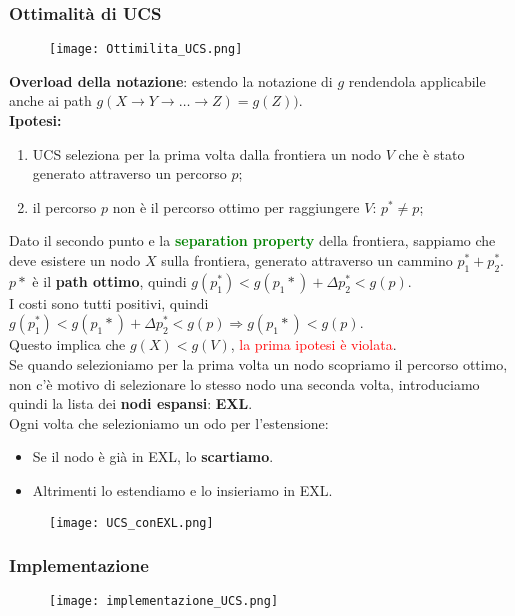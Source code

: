 \documentclass{article}
\begin{document}
\subsubsection{Ottimalità di UCS}
\begin{figure}[H]
    \texttt{[image: Ottimilita\_UCS.png]}
\end{figure}
\textbf{Overload della notazione}: estendo la notazione di $g$ rendendola applicabile anche ai path $g(X → Y → \dots → Z) = g(Z))$.
\\ \textbf{Ipotesi:}
\begin{enumerate}
    \item UCS seleziona per la prima volta dalla frontiera un nodo $V$ che è stato generato attraverso un percorso $p$;
    \item il percorso $p$ non è il percorso ottimo per raggiungere $V$: $p^* \neq p$;
\end{enumerate}
Dato il secondo punto e la \textcolor{green}{\textbf{separation property}} della frontiera, sappiamo che deve esistere un nodo $X$ sulla frontiera, generato attraverso un cammino $p_1^*+ p_2^*$. \\
$p*$ è il \textbf{path ottimo}, quindi $g(p_1^*)<g(p_1*)+\Delta{p_2^*} < g(p)$.
\\ I costi sono tutti positivi, quindi $g(p_1^*)<g(p_1*)+\Delta{p_2^*} < g(p) \Rightarrow g(p_1*) <g(p)$.
\\ Questo implica che $g(X)<g(V)$, \textcolor{red}{la prima ipotesi è violata}.
\\ Se quando selezioniamo per la prima volta un nodo scopriamo il percorso ottimo, non c'è motivo di selezionare lo stesso nodo una seconda volta, introduciamo quindi la lista dei \textbf{nodi espansi}: \textbf{EXL}.
\\ Ogni volta che selezioniamo un odo per l'estensione:
\begin{itemize}
    \item Se il nodo è già in EXL, lo \textbf{scartiamo}.
    \item Altrimenti lo estendiamo e lo insieriamo in EXL.
\end{itemize}

\begin{figure}[H]
    \texttt{[image: UCS\_conEXL.png]}
\end{figure}

\subsubsection{Implementazione}
\begin{figure}[H]
    \texttt{[image: implementazione\_UCS.png]}
\end{figure}
\end{document}
